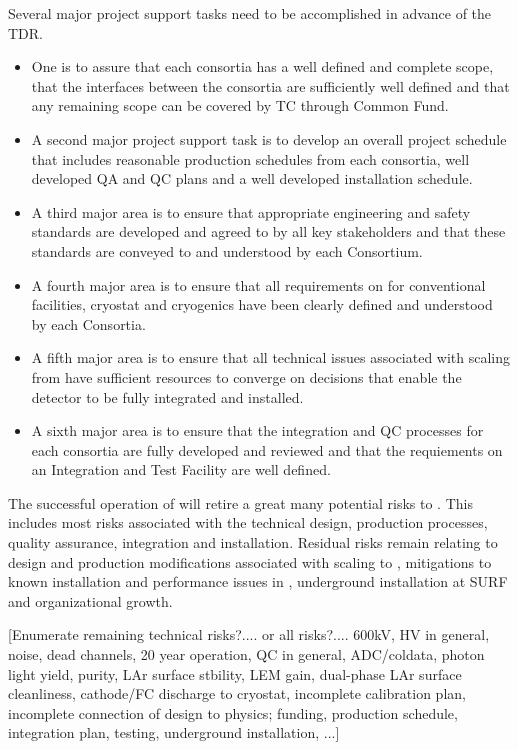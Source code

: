 Several major project support tasks need to be accomplished in advance
of the TDR.
\begin{itemize}
  \item One is to assure that each consortia has a well defined
and complete scope, that the interfaces between the consortia are
sufficiently well defined and that any remaining scope can be covered
by TC through Common Fund.
  \item A second major project support task is to
develop an overall project schedule that includes reasonable
production schedules from each consortia, well developed QA and QC
plans and a well developed installation schedule.
  \item A third major area
is to ensure that appropriate engineering and safety standards are
developed and agreed to by all key stakeholders and that these
standards are conveyed to and understood by each Consortium.
  \item A fourth
major area is to ensure that all  requirements on  for
conventional facilities, cryostat and cryogenics have been clearly
defined and understood by each Consortia.
  \item A fifth major area is to
ensure that all technical issues associated with scaling from
 have sufficient resources to converge on decisions that
enable the detector to be fully integrated and installed.
  \item A sixth
major area is to ensure that the integration and QC processes for each
consortia are fully developed and reviewed and that the requiements on
an Integration and Test Facility are well defined.
\end{itemize}

The successful operation of  will retire a great many
potential risks to . This includes most risks associated with the
technical design, production processes, quality assurance, integration
and installation. Residual risks remain relating to design and
production modifications associated with scaling to , mitigations
to known installation and performance issues in , underground
installation at SURF and organizational growth.

[Enumerate remaining technical risks?.... or all risks?.... 600kV, HV
  in general, noise, dead channels, 20 year operation, QC in general,
  ADC/coldata, photon light yield, purity, LAr surface stbility, LEM
  gain, dual-phase LAr surface cleanliness, cathode/FC discharge to
  cryostat, incomplete calibration plan, incomplete connection of
  design to physics; funding, production schedule, integration plan,
  testing, underground installation, ...]

